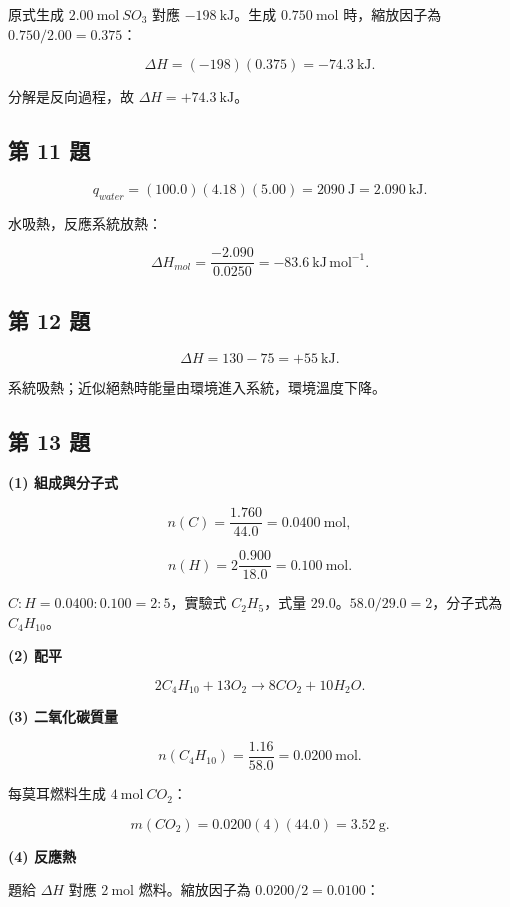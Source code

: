 \documentclass[11pt,a4paper]{article}
\begin{document}
原式生成 \(2.00\ \mathrm{mol}\ SO_3\) 對應 \(-198\ \mathrm{kJ}\)。生成 \(0.750\ \mathrm{mol}\) 時，縮放因子為 \(0.750/2.00=0.375\)：

\[
\Delta H=(-198)(0.375)=-74.3\ \mathrm{kJ}.
\]

分解是反向過程，故 \(\Delta H=+74.3\ \mathrm{kJ}\)。

\subsection{第 11 題}\label{ux7b2c-11-ux984c}

\[
q_{water}=(100.0)(4.18)(5.00)=2090\ \mathrm J=2.090\ \mathrm{kJ}.
\]

水吸熱，反應系統放熱：

\[
\Delta H_{mol}=\frac{-2.090}{0.0250}
=-83.6\ \mathrm{kJ\,mol^{-1}}.
\]

\subsection{第 12 題}\label{ux7b2c-12-ux984c}

\[
\Delta H=130-75=+55\ \mathrm{kJ}.
\]

系統吸熱；近似絕熱時能量由環境進入系統，環境溫度下降。

\subsection{第 13 題}\label{ux7b2c-13-ux984c}

\textbf{(1) 組成與分子式}

\[
n(C)=\frac{1.760}{44.0}=0.0400\ \mathrm{mol},
\]

\[
n(H)=2\frac{0.900}{18.0}=0.100\ \mathrm{mol}.
\]

\(C:H=0.0400:0.100=2:5\)，實驗式 \(C_2H_5\)，式量 \(29.0\)。\(58.0/29.0=2\)，分子式為 \(C_4H_{10}\)。

\textbf{(2) 配平}

\[
\boxed{2C_4H_{10}+13O_2\rightarrow8CO_2+10H_2O}.
\]

\textbf{(3) 二氧化碳質量}

\[
n(C_4H_{10})=\frac{1.16}{58.0}=0.0200\ \mathrm{mol}.
\]

每莫耳燃料生成 \(4\ \mathrm{mol}\ CO_2\)：

\[
m(CO_2)=0.0200(4)(44.0)=3.52\ \mathrm g.
\]

\textbf{(4) 反應熱}

題給 \(\Delta H\) 對應 \(2\ \mathrm{mol}\) 燃料。縮放因子為 \(0.0200/2=0.0100\)：
\end{document}
